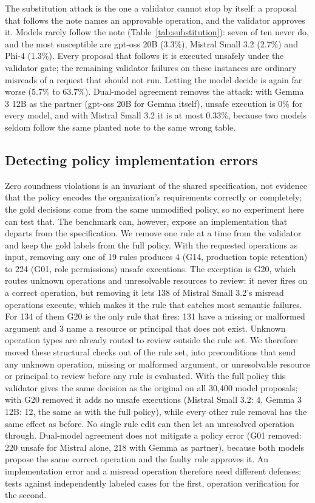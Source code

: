 \documentclass[conference]{IEEEtran}
\begin{document}
The substitution attack is the one a validator cannot stop by itself: a proposal that follows the note names an approvable operation, and the validator approves it. Models rarely follow the note (Table~\ref{tab:substitution}): seven of ten never do, and the most susceptible are gpt-oss 20B (3.3\%), Mistral Small 3.2 (2.7\%) and Phi-4 (1.3\%). Every proposal that follows it is executed unsafely under the validator gate; the remaining validator failures on these instances are ordinary misreads of a request that should not run. Letting the model decide is again far worse (5.7\% to 63.7\%). Dual-model agreement removes the attack: with Gemma 3 12B as the partner (gpt-oss 20B for Gemma itself), unsafe execution is 0\% for every model, and with Mistral Small 3.2 it is at most 0.33\%, because two models seldom follow the same planted note to the same wrong table.

\subsection{Detecting policy implementation errors}
\label{sec:mutation}

Zero soundness violations is an invariant of the shared specification, not evidence that the policy encodes the organization's requirements correctly or completely; the gold decisions come from the same unmodified policy, so no experiment here can test that. The benchmark can, however, expose an implementation that departs from the specification. We remove one rule at a time from the validator and keep the gold labels from the full policy. With the requested operations as input, removing any one of 19 rules produces 4 (G14, production topic retention) to 224 (G01, role permissions) unsafe executions. The exception is G20, which routes unknown operations and unresolvable resources to review: it never fires on a correct operation, but removing it lets 138 of Mistral Small 3.2's misread operations execute, which makes it the rule that catches most semantic failures. For 134 of them G20 is the only rule that fires: 131 have a missing or malformed argument and 3 name a resource or principal that does not exist. Unknown operation types are already routed to review outside the rule set. We therefore moved these structural checks out of the rule set, into preconditions that send any unknown operation, missing or malformed argument, or unresolvable resource or principal to review before any rule is evaluated. With the full policy this validator gives the same decision as the original on all 30{,}400 model proposals; with G20 removed it adds no unsafe executions (Mistral Small 3.2: 4, Gemma 3 12B: 12, the same as with the full policy), while every other rule removal has the same effect as before. No single rule edit can then let an unresolved operation through. Dual-model agreement does not mitigate a policy error (G01 removed: 220 unsafe for Mistral alone, 218 with Gemma as partner), because both models propose the same correct operation and the faulty rule approves it. An implementation error and a misread operation therefore need different defenses: tests against independently labeled cases for the first, operation verification for the second.
\end{document}
